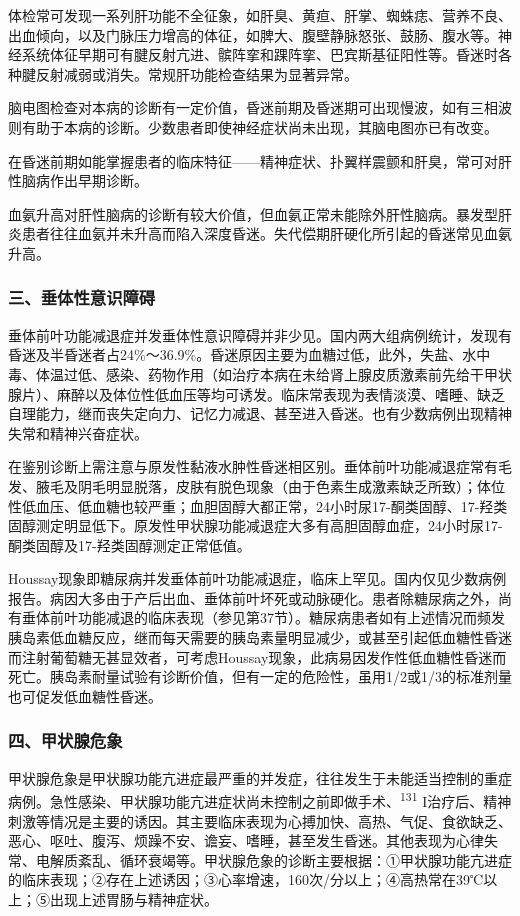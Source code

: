 体检常可发现一系列肝功能不全征象，如肝臭、黄疸、肝掌、蜘蛛痣、营养不良、出血倾向，以及门脉压力增高的体征，如脾大、腹壁静脉怒张、鼓肠、腹水等。神经系统体征早期可有腱反射亢进、髌阵挛和踝阵挛、巴宾斯基征阳性等。昏迷时各种腱反射减弱或消失。常规肝功能检查结果为显著异常。

脑电图检查对本病的诊断有一定价值，昏迷前期及昏迷期可出现慢波，如有三相波则有助于本病的诊断。少数患者即使神经症状尚未出现，其脑电图亦已有改变。

在昏迷前期如能掌握患者的临床特征------精神症状、扑翼样震颤和肝臭，常可对肝性脑病作出早期诊断。

血氨升高对肝性脑病的诊断有较大价值，但血氨正常未能除外肝性脑病。暴发型肝炎患者往往血氨并未升高而陷入深度昏迷。失代偿期肝硬化所引起的昏迷常见血氨升高。

\subsubsection{三、垂体性意识障碍}

垂体前叶功能减退症并发垂体性意识障碍并非少见。国内两大组病例统计，发现有昏迷及半昏迷者占24\%～36.9\%。昏迷原因主要为血糖过低，此外，失盐、水中毒、体温过低、感染、药物作用（如治疗本病在未给肾上腺皮质激素前先给干甲状腺片）、麻醉以及体位性低血压等均可诱发。临床常表现为表情淡漠、嗜睡、缺乏自理能力，继而丧失定向力、记忆力减退、甚至进入昏迷。也有少数病例出现精神失常和精神兴奋症状。

在鉴别诊断上需注意与原发性黏液水肿性昏迷相区别。垂体前叶功能减退症常有毛发、腋毛及阴毛明显脱落，皮肤有脱色现象（由于色素生成激素缺乏所致）；体位性低血压、低血糖也较严重；血胆固醇大都正常，24小时尿17-酮类固醇、17-羟类固醇测定明显低下。原发性甲状腺功能减退症大多有高胆固醇血症，24小时尿17-酮类固醇及17-羟类固醇测定正常低值。

Houssay现象即糖尿病并发垂体前叶功能减退症，临床上罕见。国内仅见少数病例报告。病因大多由于产后出血、垂体前叶坏死或动脉硬化。患者除糖尿病之外，尚有垂体前叶功能减退的临床表现（参见第37节）。糖尿病患者如有上述情况而频发胰岛素低血糖反应，继而每天需要的胰岛素量明显减少，或甚至引起低血糖性昏迷而注射葡萄糖无甚显效者，可考虑Houssay现象，此病易因发作性低血糖性昏迷而死亡。胰岛素耐量试验有诊断价值，但有一定的危险性，虽用1/2或1/3的标准剂量也可促发低血糖性昏迷。

\subsubsection{四、甲状腺危象}

甲状腺危象是甲状腺功能亢进症最严重的并发症，往往发生于未能适当控制的重症病例。急性感染、甲状腺功能亢进症状尚未控制之前即做手术、\textsuperscript{131}
I治疗后、精神刺激等情况是主要的诱因。其主要临床表现为心搏加快、高热、气促、食欲缺乏、恶心、呕吐、腹泻、烦躁不安、谵妄、嗜睡，甚至发生昏迷。其他表现为心律失常、电解质紊乱、循环衰竭等。甲状腺危象的诊断主要根据：①甲状腺功能亢进症的临床表现；②存在上述诱因；③心率增速，160次/分以上；④高热常在39℃以上；⑤出现上述胃肠与精神症状。

